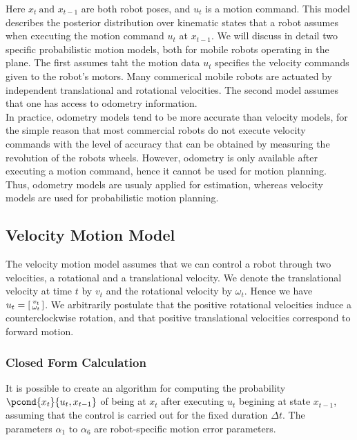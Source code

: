 Here $x_t \ \text{and } x_{t-1}$ are both robot poses, and $u_t$ is a motion command. This model describes the posterior distribution over kinematic states that a robot assumes when executing the motion command $u_t$ at $x_{t-1}$.
We will discuss in detail two specific probabilistic motion models, both for mobile robots operating in the plane.
The first assumes taht the motion data $u_t$ specifies the velocity commands given to the robot's motors. Many commerical mobile robots are actuated by independent translational and rotational velocities.
The second model assumes that one has access to odometry information.\\

In practice, odometry models tend to be more accurate than velocity models, for the simple reason that most commercial robots do not execute velocity commands with the level of accuracy that can be obtained by measuring the revolution of the robots wheels.
However, odometry is only available after executing a motion command, hence it cannot be used for motion planning. Thus, odometry models are usualy applied for estimation, whereas velocity models are used for probabilistic motion planning.

\newpage

\subsection{Velocity Motion Model}
The velocity motion model assumes that we can control a robot through two velocities, a rotational and a translational velocity.
We denote the translational velocity at time $t$ by $v_t$ and the rotational velocity by $\omega_t$. Hence we have $u_t = \begin{bsmallmatrix} v_t \\ \omega_t \end{bsmallmatrix}$.
We arbitrarily postulate that the positive rotational velocities induce a counterclockwise rotation, and that positive translational velocities correspond to forward motion.\\

\subsubsection{Closed Form Calculation}
It is possible to create an algorithm for computing the probability $\pcond{x_t}{u_t, x_{t-1}}$ of being at $x_t$ after executing $u_t$ begining at state $x_{t-1}$, assuming that the control is carried out for the fixed duration $\Delta t$.
The parameters $\alpha_1 \text{ to } \alpha_6$ are robot-specific motion error parameters.\\

